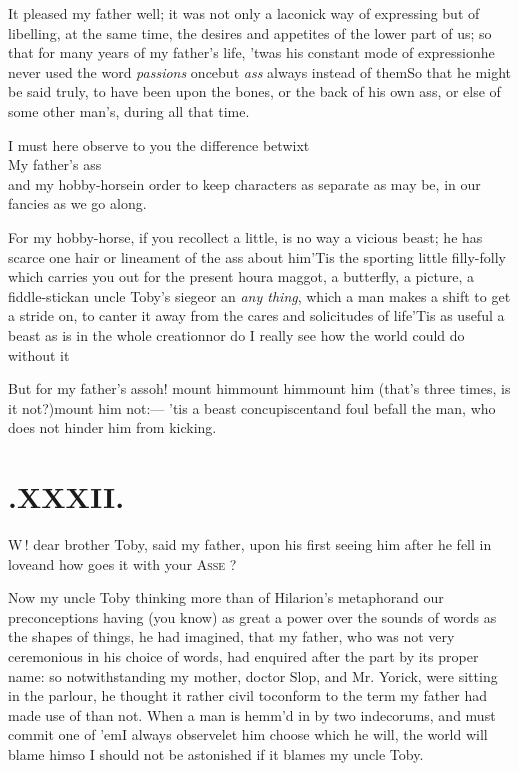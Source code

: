 \documentclass{article}
\begin{document}
It pleased my father well; it was not only a laconick way of
expressing\tsh\break
but of libelling, at the same time, the desires and appetites of
the lower part of us; so that for many years of my father’s
life, ’twas his constant mode of expression\tsk he never used
the word \textit{passions} once\tsk but \textit{ass} always
instead of them\tsh So that he might be said truly, to have been
upon the bones, or the back of his own ass, or else of some
other man’s, during all that time.

I must here observe to you the difference betwixt\\
\null\qquad My father’s ass\\
\null\qquad and my hobby-horse\tsk in order to keep
characters as separate as may be, in our fancies as we go
along.

\newpage
For my hobby-horse, if you recollect a little, is no way a
vicious beast; he has scarce one hair or lineament of the ass about
him\tsh ’Tis the sporting little filly-folly which
carries you out for the present hour\tsk a maggot, a butterfly, a
picture, a fiddle-stick\tsk an uncle Toby’s
siege\tsk or an \textit{any thing}, which a man makes a shift to
get a stride on, to canter it away from the cares and solicitudes
of life\tsk ’Tis as useful a beast as is in the whole
creation\tsk nor do I really see how the world could do without
it\tsh

\noindent
\tsh But for my father’s ass\tsh oh!
mount him\tsk mount him\tsk mount him\tsk \break
(that’s three times, is it not?)\tsk mount him not:— ’tis a beast
concupiscent\tsk and foul befall the man, who does not hinder him
from kicking.

\section{.\enspace XXXII.}

\lettrine{W}{\,}! dear brother Toby, said\break
my father, upon his first seeing him after he fell in
love\tsk and how goes it with your \textsc{Asse} ?

Now my uncle Toby thinking more 
than of Hilarion’s metaphor\tsk and our preconceptions having (you know) as great a
power over the sounds of words as the shapes of things, he had imagined, that my
father, who was not very ceremonious in his choice of words, had enquired after the
part by its proper name: so notwithstanding my mother, doctor Slop, and Mr.\@
Yorick, were sitting in the parlour, he thought it rather civil to\pb conform to the
term my father had made use of than not. When a man is hemm’d in by two indecorums,
and must commit one of ’em\tsk I always observe\tsk\break let him choose which he will, the
world will blame him\tsk so I should not be astonished if it blames my uncle Toby.
\end{document}
